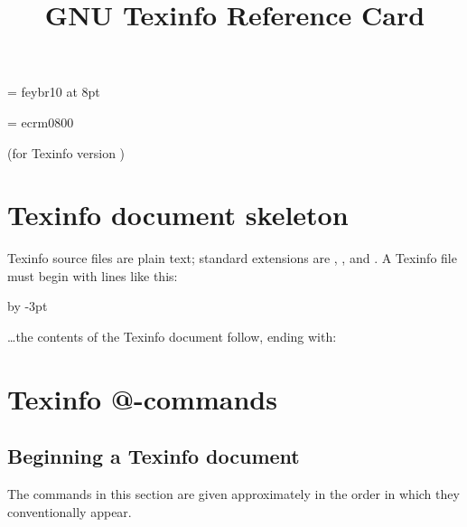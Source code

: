 \def\ordf{\leavevmode\raise1ex\hbox{\fiverm \underbar{a}}}
\def\ordm{\leavevmode\raise1ex\hbox{\fiverm \underbar{o}}}

\font\eurofont = feybr10 at 8pt
\def\euro{{\eurofont e}}

\font\ecfont = ecrm0800
\def\DH{{\ecfont \char"D0}} %
\def\dh{{\ecfont \char"F0}} %
\def\TH{{\ecfont \char"DE}} %
\def\th{{\ecfont \char"FE}} %
\def\guillemetleft{{\ecfont \char"13}}
\def\guillemotleft{\guillemetleft}
\def\guillemetright{{\ecfont \char"14}}
\def\guillemotright{\guillemetright}
\def\guilsinglleft{{\ecfont \char"0E}}
\def\guilsinglright{{\ecfont \char"0F}}
\def\quotedblbase{{\ecfont \char"12}}
\def\quotesinglbase{{\ecfont \char"0D}}
\def\ogonek#1{{%
    \ecfont \setbox0=\hbox{#1}%
    \ifdim\ht0=1ex\accent"0C #1%
    \else\ooalign{\unhbox0\crcr\hidewidth\char"0C \hidewidth}%
    \fi
}}
\def\quoteleft{`}
\def\quoteright{'}
\def\quotedblleft{``}
\def\quotedblright{''}


% 
\title{GNU Texinfo Reference Card}

\centerline{(for Texinfo version \versionTexinfo)}
\vskip1pt
\centerline{}

\chapter{Texinfo document skeleton}

Texinfo source files are plain text; standard extensions are
, , and .  A Texinfo file must
begin with lines like this:

{\advance\baselineskip by -3pt
\hfil\break
{}\hfil\break
{}}

\dots the contents of the Texinfo document follow,
ending with:\hfil\break
{}


\chapter{Texinfo @-commands}

\section{Beginning a Texinfo document}

The commands in this section are given approximately in the order in
which they conventionally appear.

